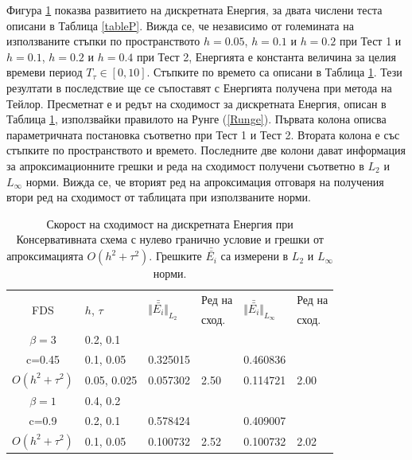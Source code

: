 \documentclass[a4paper]{article}
\newcommand{\rf}[1]{(\ref{#1})}
\theoremstyle{remark}
\begin{document}
\begin{large}
\begin{figure}[ht]
\label{EnOnly}
\end{figure}
Фигура \ref{EnOnly} показва развитието на дискретната Енергия, за двата числени теста описани в Таблица \ref{tableP}. Вижда се, че независимо от големината на използваните стъпки по пространството $h = 0.05$, $h = 0.1$ и $h = 0.2$ при Тест 1 и $h = 0.1$, $h = 0.2$ и $h = 0.4$ при Тест 2, Енергията е константа величина за целия времеви период $T_{\tau} \in [0, 10]$. Стъпките по времето са описани в Таблица \ref{tableD}. Тези резултати в последствие ще се съпоставят с Енергията получена при метода на Тейлор. Пресметнат е и редът на сходимост за дискретната Енергия, описан в Таблица \ref{tableD}, използвайки правилото на Рунге \rf{Runge}. Първата колона описва параметричната постановка съответно при Тест 1 и Тест 2. Втората колона е със стъпките по пространството и времето. Последните две колони дават информация за апроксимационните грешки и реда на сходимост получени съответно в $L_2$ и $L_\infty$ норми. Вижда се, че вторият ред на апроксимация отговаря на получения втори ред на сходимост от таблицата при използваните норми.
\begin{table}[ht]
\centering
\small
		\begin{tabular}{||c|l|ll|ll||}
			\hline
			\hline
      \multirow{2  }{*}{FDS}        & \multirow{2  }{*}{$h$, $\tau$}  &  	\multirow{2  }{*}{ $\Vert \bar{\bar{ E_i}} \Vert_{L_2}$ }	&Ред на	& \multirow{2  }{*}{ $\Vert \bar{\bar{ E_i}} \Vert_{L_\infty}$ } 		&Ред на   \\
	                                        &                                                & 							 					&  сход. 	& 								       					& сход. \\
   			\hline 
					\hline 
  $\beta=3$                &0.2, 0.1         &                    &                &                  &                   \\
   c=0.45                     &0.1, 0.05         & 0.325015   &                & 0.460836  &                   \\
     $O(h^2 + \tau^ 2)$ &0.05, 0.025  & 0.057302   & 2.50       & 0.114721  & 2.00   \\
	   \hline
			\hline 
       $\beta=1$           & 0.4, 0.2       &                   &           &                 &   \\
                  c=0.9       & 0.2, 0.1        & 0.578424   &          &0.409007  &   \\
  $O(h^2+ \tau^2)$  & 0.1, 0.05       & 0.100732   & 2.52  &0.100732  & 2.02  \\
	   \hline
			\hline 
		\end{tabular}
		\caption{Скорост на сходимост на дискретната Енергия при Консервативната схема с нулево гранично условие и грешки от апроксимацията $O(h^{2} + \tau^2 )$. Грешките $\bar{\bar{ E_i}}$ са измерени в $L_2$ и $L_\infty$ норми.}
\label{tableD}
\end{table}


\end{large}
\end{document}
